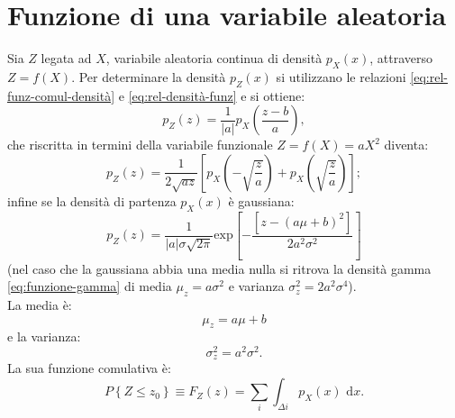 \section{Funzione di una variabile aleatoria} %
\label{sec:funz-una-var}
Sia $Z$ legata ad $X$, variabile aleatoria continua di densità $p_{X}{(x)}$, attraverso $Z=f(X)$. Per determinare la densità $p_{Z}(x)$ si utilizzano le relazioni \ref{eq:rel-funz-comul-densità} e \ref{eq:rel-densità-funz} e si ottiene:
\begin{equation}
\label{eq:densità-una-var}
p_{ Z }\left( z \right) =\frac { 1 }{ \left| a \right|  } p_{ X }\left( \frac { z-b }{ a }  \right),
\end{equation}
che riscritta in termini della variabile funzionale $Z=f(X)=aX^2$ diventa:
\begin{equation}
p_{ Z }\left( z \right) =\frac { 1 }{ 2\sqrt { az }  } \left[ p_{ X }\left( -\sqrt { \frac { z }{ a }  }  \right) +p_{ X }\left( \sqrt { \frac { z }{ a }  }  \right)  \right];
\end{equation}
infine se la densità di partenza $p_{X}{(x)}$ è gaussiana:
\begin{equation}
p_{ Z }\left( z \right) =\frac { 1 }{ \left| a \right| \sigma \sqrt { 2\pi  }  } \textrm{exp}\left[ -\frac { \left[ z-{ \left( a\mu +b \right)  }^{ 2 } \right]  }{ 2{ a }^{ 2 }{ \sigma }^{ 2 } }  \right] 
\end{equation}
(nel caso che la gaussiana abbia una media nulla si ritrova la densità gamma \ref{eq:funzione-gamma} di media $\mu_z=a\sigma^2$ e varianza $\sigma_{z}^{2}=2a^2\sigma^4$). \\La media è:
\begin{equation}
{ \mu  }_{ z }=a\mu +b
\end{equation}
e la varianza:
\begin{equation}
{ \sigma  }_{ z }^{ 2 }=a^{ 2 }\sigma ^{ 2 }.
\end{equation}
La sua funzione comulativa è:
\begin{equation}
P\left\{ Z\le z_{ 0 } \right\} \equiv F_{ Z }\left( z \right) =\sum _{ i }{ \int _{ \Delta i }{ p_{ X }\left( x \right) \textrm{ d}x }  } .
\end{equation}

